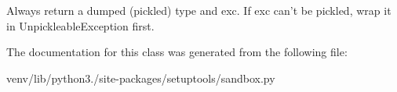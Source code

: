 \begin{DoxyVerb}Always return a dumped (pickled) type and exc. If exc can't be pickled,
wrap it in UnpickleableException first.
\end{DoxyVerb}
 

The documentation for this class was generated from the following file\+:\begin{DoxyCompactItemize}
\item 
venv/lib/python3./site-\/packages/setuptools/sandbox.\+py\end{DoxyCompactItemize}
